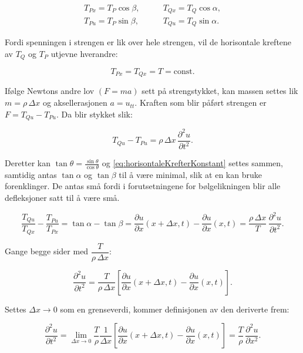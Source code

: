 \begin{align*}
  T_{Px} = T_P \cos\beta, &\qquad T_{Qx} = T_Q \cos\alpha,\\
  T_{Pu} = T_P \sin\beta, &\qquad T_{Qu} = T_Q \sin\alpha.
\end{align*}

Fordi spenningen i strengen er lik over hele strengen, vil de horisontale kreftene
av \(T_Q\) og \(T_P\) utjevne hverandre:

\begin{equation}
  T_{Px} = T_{Qx} = T = \text{const.}
  \label{eq:horisontaleKrefterKonstant}
\end{equation}

Ifølge Newtons andre lov \((F=ma)\) sett på strengstykket, kan massen settes lik\(m=\rho\,\Delta x\) og
aksellerasjonen \(a=u_{tt}\). Kraften som blir påført strengen er \(F=T_{Qu}-T_{Pu}\). Da blir stykket slik:

\begin{equation*}
  T_{Qu}-T_{Pu}=\rho\,\Delta x\,\frac{\partial^2 u}{\partial t^2}.
\end{equation*}

Deretter kan \(\tan\theta=\frac{\sin\theta}{\cos\theta}\) og \eqref{eq:horisontaleKrefterKonstant} settes sammen, samtidig
antas \(\tan\alpha\) og \(\tan\beta\) til å være minimal, slik at en kan bruke forenklinger. De antas små fordi
i forutsetningene for bølgelikningen blir alle defleksjoner satt til å være små. 

\begin{equation}
  \frac{T_{Qu}}{T_{Qx}}-\frac{T_{Pu}}{T_{Px}}
  = \tan\alpha - \tan\beta
  = \frac{\partial u}{\partial x}(x+\Delta x,t)-\frac{\partial u}{\partial x}(x,t)
  = \frac{\rho\,\Delta x}{T}\,\frac{\partial^2 u}{\partial t^2}.
  \label{eq:krefterPaStykke}
\end{equation}

Gange begge sider med \(\dfrac{T}{\rho\,\Delta x}\):

\begin{equation}
  \frac{\partial^2 u}{\partial t^2}
  = \frac{T}{\rho\,\Delta x}\left[
     \frac{\partial u}{\partial x}(x+\Delta x,t)-\frac{\partial u}{\partial x}(x,t)
    \right].
  \label{eq:tidPartiellDerivert}
\end{equation}

Settes \(\Delta x\to 0\) som en grenseverdi, kommer definisjonen av den deriverte frem:

\begin{equation}
  \frac{\partial^2 u}{\partial t^2}
  = \lim_{\Delta x\to 0}\frac{T}{\rho}\frac{1}{\Delta x}
    \left[\frac{\partial u}{\partial x}(x+\Delta x,t)-\frac{\partial u}{\partial x}(x,t)\right]
  = \frac{T}{\rho}\,\frac{\partial^2 u}{\partial x^2}.
  \label{eq:deltaXGarMotNull}
\end{equation}

